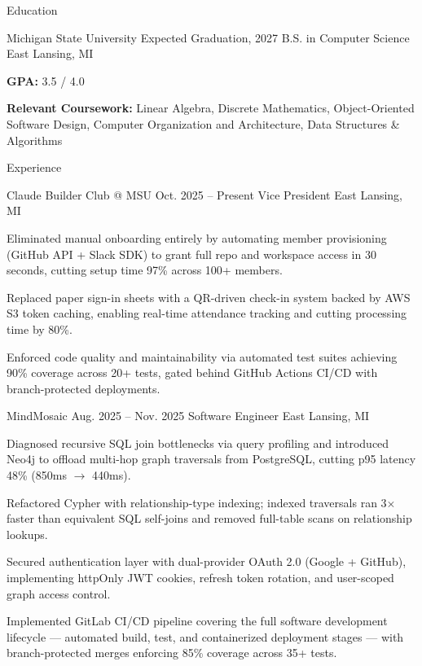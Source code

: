\documentclass[
	11pt
]{../../../resume}
\begin{document}
	\begin{rSection}{E}{ducation}
		\begin{rSectionEntry}
			{Michigan State University}
			{Expected Graduation, 2027}
			{B.S. in Computer Science}
			{}
			{East Lansing, MI}

			\item \textbf{GPA:} 3.5 / 4.0
			\item \textbf{Relevant Coursework:} Linear Algebra, Discrete Mathematics, Object-Oriented Software Design, Computer Organization and Architecture, Data Structures \& Algorithms
		\end{rSectionEntry}
	\end{rSection}

	\begin{rSection}{E}{xperience}
		\begin{rSectionEntry}
			{Claude Builder Club @ MSU}
			{Oct. 2025 -- Present}
			{Vice President}
			{}
			{East Lansing, MI}

			\item Eliminated manual onboarding entirely by automating member provisioning (GitHub API + Slack SDK) to grant full repo and workspace access in 30 seconds, cutting setup time 97\% across 100+ members.
			\item Replaced paper sign-in sheets with a QR-driven check-in system backed by AWS S3 token caching, enabling real-time attendance tracking and cutting processing time by 80\%.
			\item Enforced code quality and maintainability via automated test suites achieving 90\% coverage across 20+ tests, gated behind GitHub Actions CI/CD with branch-protected deployments.
		\end{rSectionEntry}

		\begin{rSectionEntry}
			{MindMosaic}
			{Aug. 2025 -- Nov. 2025}
			{Software Engineer}
			{}
			{East Lansing, MI}

			\item Diagnosed recursive SQL join bottlenecks via query profiling and introduced Neo4j to offload multi-hop graph traversals from PostgreSQL, cutting p95 latency 48\% (850ms $\rightarrow$ 440ms).
			\item Refactored Cypher with relationship-type indexing; indexed traversals ran 3$\times$ faster than equivalent SQL self-joins and removed full-table scans on relationship lookups.
			\item Secured authentication layer with dual-provider OAuth 2.0 (Google + GitHub), implementing httpOnly JWT cookies, refresh token rotation, and user-scoped graph access control.
			\item Implemented GitLab CI/CD pipeline covering the full software development lifecycle — automated build, test, and containerized deployment stages — with branch-protected merges enforcing 85\% coverage across 35+ tests.
		\end{rSectionEntry}
	\end{rSection}
\end{document}
